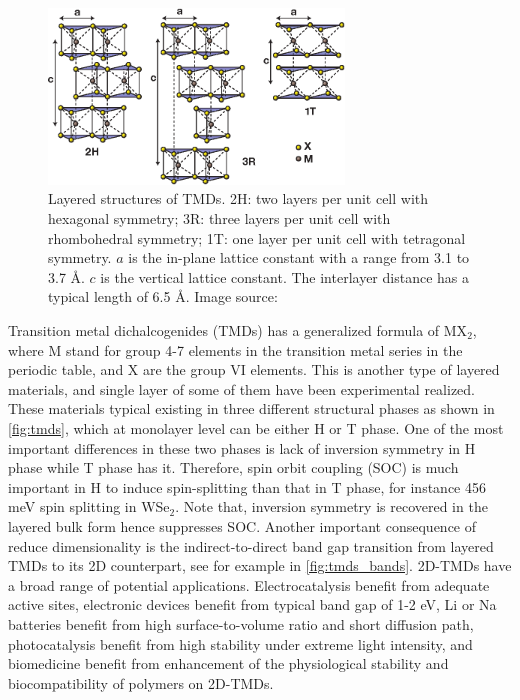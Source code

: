 \begin{figure}[htbp!] 
\centering  
\includegraphics[width=0.7\textwidth]{tmds.eps}
\caption[Layered structures of TMDs]{Layered structures of TMDs. 2H: two layers per unit cell with hexagonal symmetry; 3R: three layers per unit cell with rhombohedral symmetry; 1T: one layer per unit cell with tetragonal symmetry. $a$ is the in-plane lattice constant with a range from 3.1 to 3.7 \AA. $c$ is the vertical lattice constant. The interlayer distance has a typical length of 6.5 \AA. Image source: \cite{Wang2012}}  
\label{fig:tmds}
\end{figure} 

Transition metal dichalcogenides (TMDs) has a generalized formula of MX$_2$, where M stand for group 4-7 elements in the transition metal series in the periodic table, and X are the group VI elements. This is another type of layered materials, and single layer of some of them have been experimental realized.  These materials typical existing in three different structural phases as shown in \autoref{fig:tmds}, which at monolayer level can be either H or T phase. One of the most important differences in these two phases is lack of inversion symmetry in H phase while T phase has it. Therefore, spin orbit coupling (SOC) is much important in H to induce spin-splitting than that in T phase, for instance 456 meV spin splitting in WSe$_2$\cite{Zhu2011giant}. Note that, inversion symmetry is recovered in the layered bulk form hence suppresses SOC. Another important consequence of reduce dimensionality is the indirect-to-direct band gap transition from layered TMDs to its 2D counterpart, see for example in \autoref{fig:tmds_bands}. 2D-TMDs have a broad range of potential applications. Electrocatalysis\cite{kim2013enhanced,huang2014synthesis} benefit from adequate active sites, electronic devices\cite{RadisavljevicB2011,sun2014fabrication} benefit from typical band gap of 1-2 eV, Li or Na batteries\cite{chang2011cysteine,chen2013situ} benefit from high surface-to-volume ratio and short diffusion path, photocatalysis benefit from high stability under extreme light intensity\cite{Li2013,Parzinger2015}, and biomedicine benefit from enhancement of the physiological stability and biocompatibility of polymers on 2D-TMDs\cite{Cheng2014,Yin2014}. 



